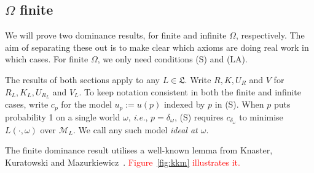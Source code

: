 \documentclass[11pt]{article}
\theoremstyle{definition}
\theoremstyle{remark}
\newcommand{\M}{\mathcal M}
\begin{document}
\subsection{$\Omega$ finite}\label{sec:kkm}


We will prove two dominance results, for finite and infinite $\Omega$, respectively. The aim of separating these out is to make clear which axioms are doing real work in which cases. For finite $\Omega$, we only need conditions (S) and (LA).

The results of both sections apply to any $L\in\mathfrak L$. Write $R,K,U_R$ and $V$ for $R_L,K_L,U_{R_L}$ and $V_L$. To keep notation consistent in both the finite and infinite cases, write $c_p$ for the model $u_p:=u(p)$ indexed by $p$ in (S). When $p$ puts probability 1 on a single world $\omega$, \textit{i.e.}, $p=\delta_\omega$, (S) requires $c_{\delta_\omega}$ to minimise $L(\cdot,\omega)$ over $\M_L$. We call any such model \emph{ideal at $\omega$}. 



The finite dominance result utilises a well-known lemma from Knaster, Kuratowski and Mazurkiewicz~\cite{KKM}. \textcolor{red}{Figure~\ref{fig:kkm} illustrates it.}
\end{document}
